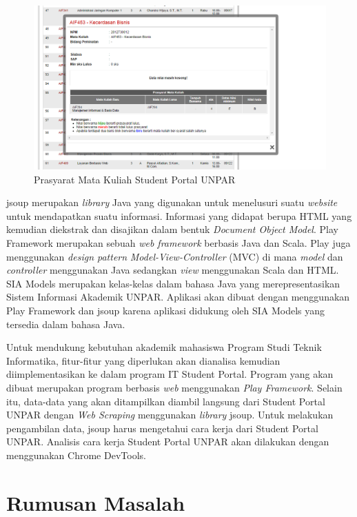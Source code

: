 \begin{figure}
	\centering
	\includegraphics[scale=0.5]{Gambar/contoh-portal}
	\caption{Prasyarat Mata Kuliah Student Portal UNPAR} 
	\label{fig:1_prasyarat_student_portal}
\end{figure}

jsoup\cite{jsoup} merupakan \textit{library} Java yang digunakan untuk menelusuri suatu \textit{website} untuk mendapatkan suatu informasi. Informasi yang didapat berupa HTML yang kemudian diekstrak dan disajikan dalam bentuk \textit{Document Object Model}. Play Framework\cite{Leroux:2014} merupakan sebuah \textit{web framework} berbasis Java dan Scala. Play juga menggunakan \textit{design pattern} \textit{Model-View-Controller} (MVC) di mana \textit{model} dan \textit{controller} menggunakan Java sedangkan \textit{view} menggunakan Scala dan HTML. SIA Models\cite{siamodels} merupakan kelas-kelas dalam bahasa Java yang merepresentasikan Sistem Informasi Akademik UNPAR. Aplikasi akan dibuat dengan menggunakan Play Framework dan jsoup karena aplikasi didukung oleh SIA Models yang tersedia dalam bahasa Java. 

Untuk mendukung kebutuhan akademik mahasiswa Program Studi Teknik Informatika, fitur-fitur yang diperlukan akan dianalisa kemudian diimplementasikan ke dalam program IT Student Portal. Program yang akan dibuat merupakan program berbasis \textit{web} menggunakan \textit{Play Framework}. Selain itu, data-data yang akan ditampilkan diambil langsung dari Student Portal UNPAR dengan \textit{Web Scraping} menggunakan \textit{library} jsoup. Untuk melakukan pengambilan data, jsoup harus mengetahui cara kerja dari Student Portal UNPAR. Analisis cara kerja Student Portal UNPAR akan dilakukan dengan menggunakan Chrome DevTools. 

\section{Rumusan Masalah}
\label{sec:rumusan_masalah}

